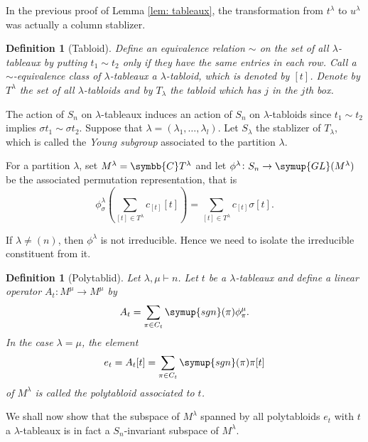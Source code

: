 \documentclass{assignment}[2019/10/15]
\newcommand{\lr}[3]{\left#1#3\right#2}
\theoremstyle{plain}
\newtheorem{definition}[theorem]{Definition}
\newcommand{\BC}{\symbb{C}}
\newcommand{\GL}{\mathop{}\!\symup{GL}}
\newcommand{\sgn}{\mathop{}\!\symup{sgn}}
\begin{document}
    In the previous proof of Lemma \ref{lem: tableaux}, the transformation from $t^\lambda$ to $u^\lambda$ was actually a column stablizer.

    \begin{definition}[Tabloid]
        Define an equivalence relation $\sim$ on the set of all $\lambda$-tableaux by putting $t_1\sim t_2$ only if they have the same entries in each row. Call a $\sim$-equivalence class of $\lambda$-tableaux a $\lambda$-\emph{tabloid}, which is denoted by $[t]$. Denote by $T^\lambda$ the set of all $\lambda$-tabloids and by $T_\lambda$ the tabloid which has $j$ in the $j$th box.
    \end{definition}

    The action of $S_n$ on $\lambda$-tableaux induces an action of $S_n$ on $\lambda$-tabloids since $t_1\sim t_2$ implies $\sigma t_1\sim \sigma t_2$. Suppose that $\lambda = (\lambda_1, \dotsc, \lambda_l)$. Let $S_\lambda$ the stablizer of $T_\lambda$, which is called the \emph{Young subgroup} associated to the partition $\lambda$.

    For a partition $\lambda$, set $M^\lambda = \BC T^\lambda$ and let $\phi^\lambda\colon S_n\to \GL(M^\lambda)$ be the associated permutation representation, that is
    \begin{equation}
        \phi_\sigma^\lambda\lr(){\sum_{[t]\in T^\lambda}c_{[t]}[t]} = \sum_{[t]\in T^\lambda}c_{[t]}\sigma[t].
    \end{equation}

    If $\lambda\neq (n)$, then $\phi^\lambda$ is not irreducible. Hence we need to isolate the irreducible constituent from it.

    \begin{definition}[Polytablid]
        Let $\lambda, \mu\vdash n$. Let $t$ be a $\lambda$-tableaux and define a linear operator $A_t\colon M^\mu\to M^\mu$ by
        \begin{equation}
            A_t = \sum_{\pi\in C_t}\sgn(\pi)\phi^\mu_\pi.
        \end{equation}
        In the case $\lambda=\mu$, the element
        \begin{equation}
            e_t = A_t[t] = \sum_{\pi\in C_t}\sgn(\pi)\pi[t]
        \end{equation}
        of $M^\lambda$ is called the polytabloid associated to $t$.
    \end{definition}

    We shall now show that the subspace of $M^\lambda$ spanned by all polytabloids $e_t$ with $t$ a $\lambda$-tableaux is in fact a $S_n$-invariant subspace of $M^\lambda$.
\end{document}
